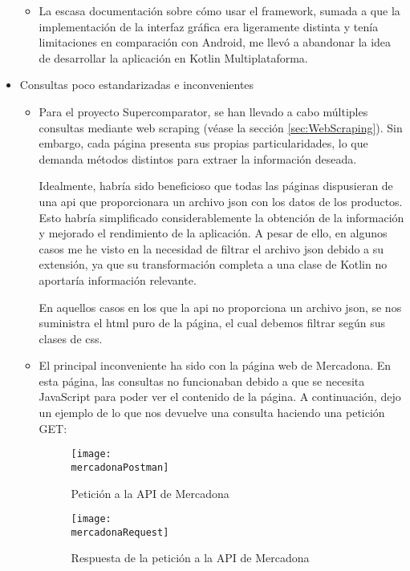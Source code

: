 \documentclass[12pt,twoside,titlepage]{report}
\newcommand{\titulotrabajo}{Supercomparator}
\newcommand{\mercadonaPostman}{images/mercadona_postman.png} %
\newcommand{\mercadonaRequest}{images/mercadona_request.png} %
\begin{document}
\begin{itemize}
\begin{itemize}
		      \item La escasa documentación sobre cómo usar el framework, sumada a que la implementación de la interfaz gráfica era ligeramente distinta y tenía limitaciones en comparación con Android, me llevó a abandonar la idea de desarrollar la aplicación en Kotlin Multiplataforma.

	      \end{itemize}

	\item Consultas poco estandarizadas e inconvenientes

	      \begin{itemize}

		      \item Para el proyecto \titulotrabajo, se han llevado a cabo múltiples consultas mediante web scraping (véase la sección \ref{sec:WebScraping}). Sin embargo, cada página presenta sus propias particularidades, lo que demanda métodos distintos para extraer la información deseada.

		            Idealmente, habría sido beneficioso que todas las páginas dispusieran de una api que proporcionara un archivo json con los datos de los productos. Esto habría simplificado considerablemente la obtención de la información y mejorado el rendimiento de la aplicación. A pesar de ello, en algunos casos me he visto en la necesidad de filtrar el archivo json debido a su extensión, ya que su transformación completa a una clase de Kotlin no aportaría información relevante.

		            En aquellos casos en los que la api no proporciona un archivo json, se nos suministra el html puro de la página, el cual debemos filtrar según sus clases de css.

		      \item El principal inconveniente ha sido con la página web de Mercadona. En esta página, las consultas no funcionaban debido a que se necesita JavaScript para poder ver el contenido de la página. A continuación, dejo un ejemplo de lo que nos devuelve una consulta haciendo una petición GET:


			  \begin{figure}[htbp]
				\centering
				\texttt{[image: \\mercadonaPostman]}
				\caption{Petición a la API de Mercadona}
				\label{fig:mercadonaPostman}
			\end{figure}

			\begin{figure}[htbp]
				\centering
				\texttt{[image: \\mercadonaRequest]}
				\caption{Respuesta de la petición a la API de Mercadona}
				\label{fig:mercadonaRequest}
			\end{figure}


\end{itemize}
\end{itemize}
\end{document}
